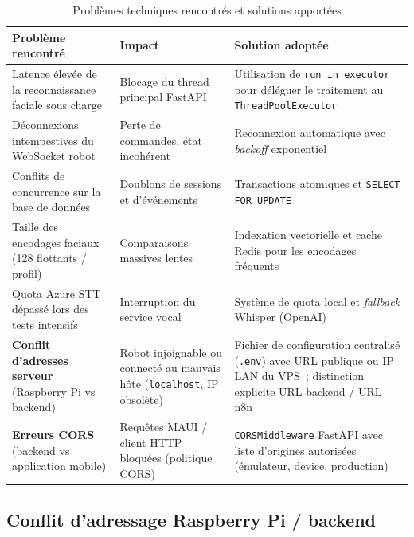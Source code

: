 \documentclass[a4paper,12pt]{report}
\begin{document}
	\begin{table}[htbp]
		\centering
		\caption{Problèmes techniques rencontrés et solutions apportées}
		\label{tab:problemes}
		\renewcommand{\arraystretch}{1.4}
		\begin{tabularx}{\textwidth}{|>{\raggedright\arraybackslash}p{3.8cm}|>{\raggedright\arraybackslash}p{3.2cm}|>{\raggedright\arraybackslash}X|}
			\hline
			\textbf{Problème rencontré} & \textbf{Impact} & \textbf{Solution adoptée} \\
			\hline
			Latence élevée de la reconnaissance faciale sous charge
			& Blocage du thread principal FastAPI
			& Utilisation de \texttt{run\_in\_executor} pour déléguer le
			traitement au \texttt{ThreadPoolExecutor} \\
			\hline
			Déconnexions intempestives du WebSocket robot
			& Perte de commandes, état incohérent
			& Reconnexion automatique avec \textit{backoff} exponentiel \\
			\hline
			Conflits de concurrence sur la base de données
			& Doublons de sessions et d'événements
			& Transactions atomiques et \texttt{SELECT FOR UPDATE} \\
			\hline
			Taille des encodages faciaux (128 flottants / profil)
			& Comparaisons massives lentes
			& Indexation vectorielle et cache Redis pour les encodages
			fréquents \\
			\hline
			Quota Azure STT dépassé lors des tests intensifs
			& Interruption du service vocal
			& Système de quota local et \textit{fallback} Whisper (OpenAI) \\
			\hline
			\textbf{Conflit d'adresses serveur}\newline
			(Raspberry Pi vs backend)
			& Robot injoignable ou connecté au mauvais hôte (\texttt{localhost}, IP obsolète)
			& Fichier de configuration centralisé (\texttt{.env}) avec URL publique ou IP LAN du VPS~; distinction explicite URL backend / URL n8n \\
			\hline
			\textbf{Erreurs CORS}\newline
			(backend vs application mobile)
			& Requêtes MAUI / client HTTP bloquées (politique CORS)
			& \texttt{CORSMiddleware} FastAPI avec liste d'origines autorisées (émulateur, device, production) \\
			\hline
		\end{tabularx}
	\end{table}
	
	\subsection{Conflit d'adressage Raspberry Pi / backend}
	
\end{document}

